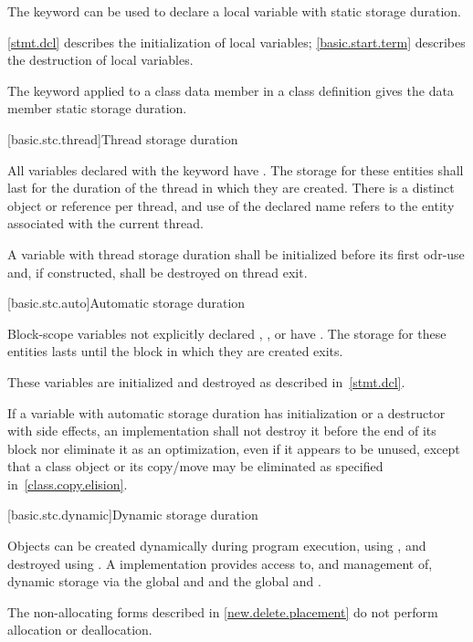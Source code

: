 \pnum
{}%
The keyword  can be used to declare a local variable with
static storage duration. \begin{note} \ref{stmt.dcl} describes the
initialization of local  variables; \ref{basic.start.term}
describes the destruction of local  variables. \end{note}

\pnum
{}%
The keyword  applied to a class data member in a class
definition gives the data member static storage duration.

[basic.stc.thread]{Thread storage duration}

\pnum
All variables declared with the  keyword have
.
The storage for these entities shall last for the duration of
the thread in which they are created. There is a distinct object or reference
per thread, and use of the declared name refers to the entity associated with
the current thread.

\pnum
A variable with thread storage duration shall be initialized before
its first odr-use and, if constructed, shall be destroyed on thread exit.

[basic.stc.auto]{Automatic storage duration}

\pnum
{}%
Block-scope variables
not explicitly declared , , or  have
. The storage
for these entities lasts until the block in which they are created exits.

\pnum
\begin{note}
These variables are initialized and destroyed as described in~\ref{stmt.dcl}.
\end{note}

\pnum
If a variable with automatic storage duration has initialization or a destructor with side
effects, an implementation shall not destroy it before the end of its block
nor eliminate it as an optimization, even if it appears to be
unused, except that a class object or its copy/move may be eliminated as
specified in~\ref{class.copy.elision}.

[basic.stc.dynamic]{Dynamic storage duration}%

\pnum
Objects can be created dynamically during program
execution, using
%
, and destroyed using
%
. A \Cpp{} implementation
provides access to, and management of, dynamic storage via the global
  and  and the global   and .
\begin{note}
The non-allocating forms described in \ref{new.delete.placement}
do not perform allocation or deallocation.
\end{note}

